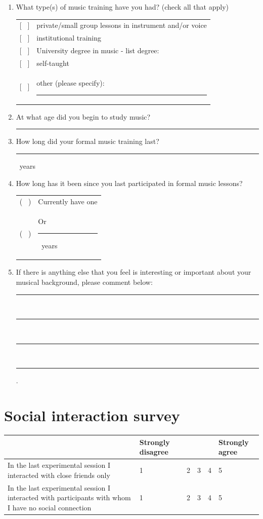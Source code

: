 \documentclass[a4paper,11pt]{article}
\newcommand{\myunderline}{\rule{2in}{.5pt}}
\begin{document}
{\begin{appendices}
\begin{enumerate}[resume]
	\item What type(s) of music training have you had? (check all that apply)

	\begin{tabular}{l l}
		{[{ \ }]} & private/small group lessons in instrument and/or voice \\
		{[{ \ }]} & institutional training \\
		{[{ \ }]} & University degree in music - list degree: \\
		{[{ \ }]} & self-taught \\
		{[{ \ }]} & other (please specify): \myunderline \\
	\end{tabular}

 	\item At what age did you begin to study music?

 	\myunderline

 	\item How long did your formal music training last?

 	\myunderline \ years
 	\item How long has it been since you last participated in formal music lessons?

	\begin{tabular}{l l}
		( \ ) & Currently have one \\
		( \ ) & Or \myunderline \ years \\
	\end{tabular}

	\item \label{appendix:music:after_break}If there is anything else that you feel is interesting or important about your musical background, please comment below:

	\rule{4.5in}{.5pt} \\
	\rule{4.5in}{.5pt} \\
	\rule{4.5in}{.5pt} \\
	\rule{4.5in}{.5pt}.

\end{enumerate}

\clearpage\section{Social interaction survey}

\begin{tabularx}{\textwidth}{p{2in} | Y Y Y Y Y }
	& Strongly disagree & & & & Strongly agree \\
	\hline
	In the last experimental session I interacted with close friends only & 1 & 2 & 3 & 4 & 5 \\
	\hline
	In the last experimental session I interacted with participants with whom I have no social connection & 1 & 2 & 3 & 4 & 5 \\
\end{tabularx}


\end{appendices}}
\end{document}
